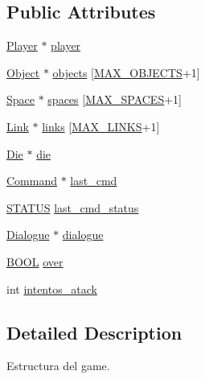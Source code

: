 \subsection*{Public Attributes}
\begin{DoxyCompactItemize}
\item 
\hyperlink{player_8h_af30e2030635a69690f85e48bc6ef202f}{Player} $\ast$ \hyperlink{struct__Game_a31406605782d71ec00c4bf258ea76267}{player}
\item 
\hyperlink{object_8h_a7f8bbcda919b65ce67f92fba08e0212f}{Object} $\ast$ \hyperlink{struct__Game_aa669bb857944c6c3b53504d179640af0}{objects} \mbox{[}\hyperlink{object_8h_acdc7844fbd4d45737d4aa56834d37829}{M\+A\+X\+\_\+\+O\+B\+J\+E\+C\+T\+S}+1\mbox{]}
\item 
\hyperlink{space_8h_a67533ffc2b70463baecc38fb0629bbfc}{Space} $\ast$ \hyperlink{struct__Game_ab4180417d9148f8abb2233ca6c4ecfe5}{spaces} \mbox{[}\hyperlink{space_8h_a5f54fd55f983a2e33ce076cd9f587e82}{M\+A\+X\+\_\+\+S\+P\+A\+C\+E\+S}+1\mbox{]}
\item 
\hyperlink{link_8h_ae3b299941e67be6971bfd64a25505eff}{Link} $\ast$ \hyperlink{struct__Game_a672f97aff892c65a6fdb43665cb57c97}{links} \mbox{[}\hyperlink{link_8h_a660ed1ec8604982002a0d6eced0e0367}{M\+A\+X\+\_\+\+L\+I\+N\+K\+S}+1\mbox{]}
\item 
\hyperlink{die_8h_a892f0b0bf81d69a1f7a14ea238e36dd3}{Die} $\ast$ \hyperlink{struct__Game_a0d6009b5dcb080489c192a9198fa7d46}{die}
\item 
\hyperlink{command_8h_a7d2935971c252377cb0fc1c8545dc2bc}{Command} $\ast$ \hyperlink{struct__Game_a47afef4b632256566d81da0f50e7a380}{last\+\_\+cmd}
\item 
\hyperlink{types_8h_a32c27cc471df37f4fc818d65de0a56c4}{S\+T\+A\+T\+U\+S} \hyperlink{struct__Game_ab42af3e37c32a66d145a9e99dedecf88}{last\+\_\+cmd\+\_\+status}
\item 
\hyperlink{struct__Dialogue}{Dialogue} $\ast$ \hyperlink{struct__Game_a15beffb9162cf746b75d11aff2f59ab3}{dialogue}
\item 
\hyperlink{types_8h_a3e5b8192e7d9ffaf3542f1210aec18dd}{B\+O\+O\+L} \hyperlink{struct__Game_a49c591e59c0e694d7a6a996a786530c2}{over}
\item 
int \hyperlink{struct__Game_ac9e58373df5129e3ca8c783f688c29fe}{intentos\+\_\+atack}
\end{DoxyCompactItemize}


\subsection{Detailed Description}
Estructura del game. 

